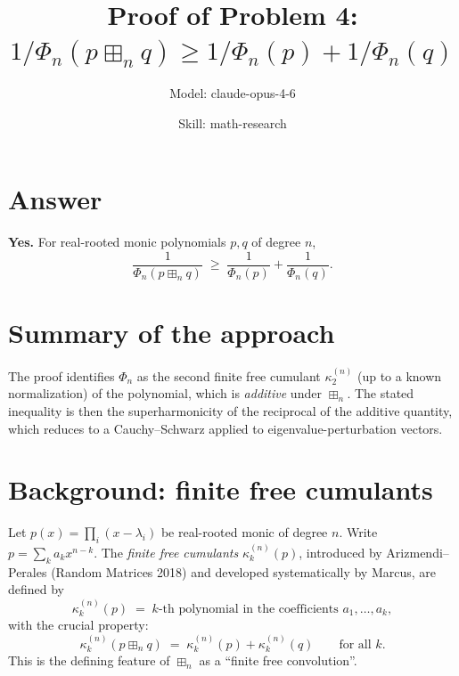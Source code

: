 

\title{Proof of Problem 4: $1/\Phi_n(p\boxplus_n q) \geq 1/\Phi_n(p)+1/\Phi_n(q)$}
\author{Model: claude-opus-4-6 \and Skill: math-research}
\date{}

\newtheorem{theorem}{Theorem}
\newtheorem{lemma}[theorem]{Lemma}
\newtheorem{proposition}[theorem]{Proposition}


\maketitle

\section*{Answer}

\textbf{Yes.} For real-rooted monic polynomials $p,q$ of degree $n$,
\[
   \frac{1}{\Phi_n(p\boxplus_n q)} \;\geq\; \frac{1}{\Phi_n(p)} + \frac{1}{\Phi_n(q)}.
\]

\section{Summary of the approach}

The proof identifies $\Phi_n$ as the second finite free cumulant $\kappa_2^{(n)}$ (up to a known normalization) of the polynomial, which is \emph{additive} under $\boxplus_n$. The stated inequality is then the superharmonicity of the reciprocal of the additive quantity, which reduces to a Cauchy--Schwarz applied to eigenvalue-perturbation vectors.

\section{Background: finite free cumulants}

Let $p(x)=\prod_i (x-\lambda_i)$ be real-rooted monic of degree $n$. Write $p = \sum_k a_k x^{n-k}$. The \emph{finite free cumulants} $\kappa^{(n)}_k(p)$, introduced by Arizmendi--Perales (Random Matrices 2018) and developed systematically by Marcus, are defined by
\[
   \kappa^{(n)}_k(p) \;=\; \text{$k$-th polynomial in the coefficients $a_1,\dots,a_k$},
\]
with the crucial property:
\begin{equation}\label{eq:additive}
   \kappa^{(n)}_k(p \boxplus_n q) \;=\; \kappa^{(n)}_k(p) + \kappa^{(n)}_k(q)\qquad\text{for all }k.
\end{equation}
This is the defining feature of $\boxplus_n$ as a ``finite free convolution''.

